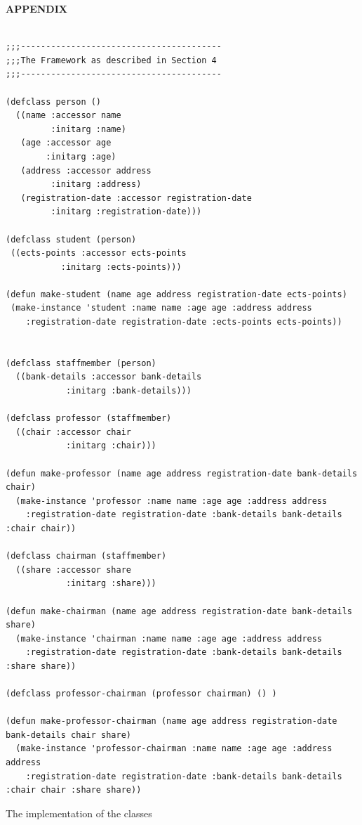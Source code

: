 \documentclass[oribibl]{llncs}
\begin{document}
\newpage
\nocite{*}



\newpage
    \begin{center}
      {\bf APPENDIX}
    \end{center}
\label{sec:appendix}

\begin{listing}[]%
\begin{verbatim}

;;;----------------------------------------
;;;The Framework as described in Section 4
;;;----------------------------------------

(defclass person ()
  ((name :accessor name
         :initarg :name)
   (age :accessor age
        :initarg :age)
   (address :accessor address
         :initarg :address)
   (registration-date :accessor registration-date
         :initarg :registration-date)))

(defclass student (person)
 ((ects-points :accessor ects-points
           :initarg :ects-points)))

(defun make-student (name age address registration-date ects-points)
 (make-instance 'student :name name :age age :address address
    :registration-date registration-date :ects-points ects-points))


(defclass staffmember (person)
  ((bank-details :accessor bank-details
            :initarg :bank-details)))

(defclass professor (staffmember)
  ((chair :accessor chair
            :initarg :chair)))

(defun make-professor (name age address registration-date bank-details chair)
  (make-instance 'professor :name name :age age :address address
    :registration-date registration-date :bank-details bank-details :chair chair))

(defclass chairman (staffmember)
  ((share :accessor share
            :initarg :share)))

(defun make-chairman (name age address registration-date bank-details share)
  (make-instance 'chairman :name name :age age :address address
    :registration-date registration-date :bank-details bank-details :share share))

(defclass professor-chairman (professor chairman) () )

(defun make-professor-chairman (name age address registration-date bank-details chair share)
  (make-instance 'professor-chairman :name name :age age :address address
    :registration-date registration-date :bank-details bank-details :chair chair :share share))

\end{verbatim}
\caption{The implementation of the classes}
\label{lst:entire-implementation}
\end{listing}
\end{document}
